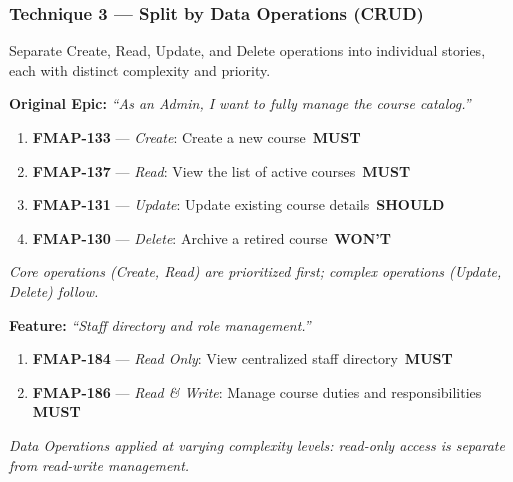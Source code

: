 \documentclass[12pt, a4paper]{article}
\newcommand{\mustbadge}{\colorbox{mustcolor}{\color{white}\tiny\bfseries\,MUST\,}}
\newcommand{\shouldbadge}{\colorbox{shouldcolor}{\color{white}\tiny\bfseries\,SHOULD\,}}
\newcommand{\wontbadge}{\colorbox{wontcolor}{\color{white}\tiny\bfseries\,WON'T\,}}
\begin{document}
\subsubsection{Technique 3 --- Split by Data Operations (CRUD)}

Separate Create, Read, Update, and Delete operations into individual stories, each with distinct complexity and priority.

\vspace{6pt}
\begin{tcolorbox}[storybox,title={\textbf{Example 3a: Course Catalog (Curriculum Module)}},fonttitle=\bfseries\color{agileblue}]
\textbf{Original Epic:} \textit{``As an Admin, I want to fully manage the course catalog.''}
\vspace{4pt}
\begin{enumerate}[itemsep=2pt]
\item \textbf{FMAP-133} --- \textit{Create}: Create a new course \mustbadge
\item \textbf{FMAP-137} --- \textit{Read}: View the list of active courses \mustbadge
\item \textbf{FMAP-131} --- \textit{Update}: Update existing course details \shouldbadge
\item \textbf{FMAP-130} --- \textit{Delete}: Archive a retired course \wontbadge
\end{enumerate}
\textit{Core operations (Create, Read) are prioritized first; complex operations (Update, Delete) follow.}
\end{tcolorbox}

\vspace{6pt}
\begin{tcolorbox}[storybox,title={\textbf{Example 3b: Staff Directory (Staff Module)}},fonttitle=\bfseries\color{agileblue}]
\textbf{Feature:} \textit{``Staff directory and role management.''}
\vspace{4pt}
\begin{enumerate}[itemsep=2pt]
\item \textbf{FMAP-184} --- \textit{Read Only}: View centralized staff directory \mustbadge
\item \textbf{FMAP-186} --- \textit{Read \& Write}: Manage course duties and responsibilities \mustbadge
\end{enumerate}
\textit{Data Operations applied at varying complexity levels: read-only access is separate from read-write management.}
\end{tcolorbox}

\vspace{10pt}
\end{document}
